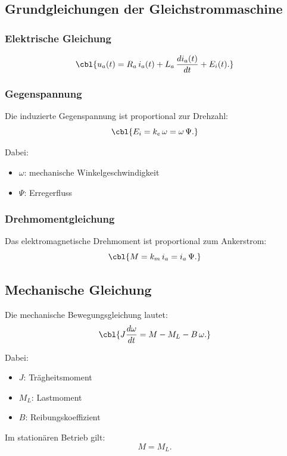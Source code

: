 \subsection{Grundgleichungen der Gleichstrommaschine}

\subsubsection{Elektrische Gleichung}

\[
\cbl{u_a(t) = R_a\, i_a(t) + L_a\, \frac{di_a(t)}{dt} + E_i(t).}
\]

\subsubsection{Gegenspannung}

Die induzierte Gegenspannung ist proportional zur Drehzahl:
\[
\cbl{E_i = k_e \, \omega = \omega \, \Psi.}
\]

Dabei:
\begin{itemize}
    \item $\omega$: mechanische Winkelgeschwindigkeit
    \item $\Psi$: Erregerfluss
\end{itemize}

\subsubsection{Drehmomentgleichung}

Das elektromagnetische Drehmoment ist proportional zum Ankerstrom:
\[
\cbl{M = k_m \, i_a = i_a \, \Psi.}
\]


\subsection{Mechanische Gleichung}

Die mechanische Bewegungsgleichung lautet:
\[
\cbl{J \frac{d\omega}{dt} = M - M_L - B\,\omega.}
\]

Dabei:
\begin{itemize}
    \item $J$: Trägheitsmoment
    \item $M_L$: Lastmoment
    \item $B$: Reibungskoeffizient
\end{itemize}

Im stationären Betrieb gilt:
\[
M = M_L.
\]

